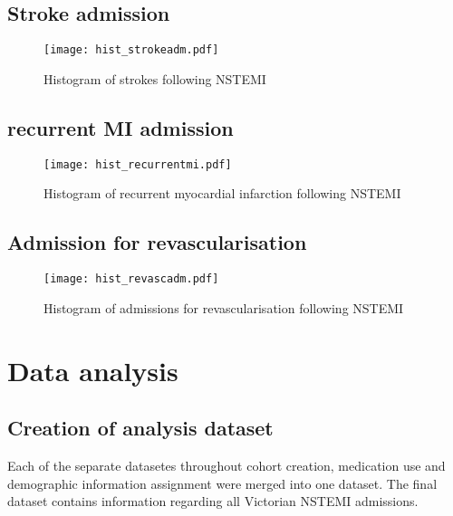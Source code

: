 \documentclass[11pt]{article}
\begin{document}
\subsection{Stroke admission}
\color{violet}
\begin{stlog}\end{stlog}
\color{black}
\begin{figure} [h]
	\centering
	\texttt{[image: hist\_strokeadm.pdf]}
	\caption{Histogram of strokes following NSTEMI}
	\label{stroke_cvd}
\end{figure}
\color{violet}
\begin{stlog}\end{stlog}
\color{black}
\subsection{recurrent MI admission}
\color{violet}
\begin{stlog}\end{stlog}
\color{black}
\begin{figure} [h]
	\centering
	\texttt{[image: hist\_recurrentmi.pdf]}
	\caption{Histogram of recurrent myocardial infarction following NSTEMI}
	\label{hist_recurrentmi}
\end{figure}

\subsection{Admission for revascularisation}
\color{black}
\begin{stlog}\end{stlog}
\color{black}
\begin{figure} [h]
	\centering
	\texttt{[image: hist\_revascadm.pdf]}
	\caption{Histogram of admissions for revascularisation following NSTEMI}
	\label{hist_revascadm}
\end{figure}

\pagebreak
\section{Data analysis}
\subsection{Creation of analysis dataset}
Each of the separate datasetes throughout cohort creation, medication use and demographic information assignment were merged into one dataset. The final dataset contains information regarding all Victorian NSTEMI admissions.
\color{violet}
\begin{stlog}\end{stlog}
\color{black}
\pagebreak
\end{document}
